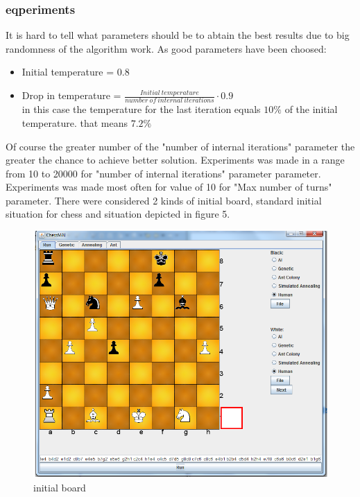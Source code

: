 \documentclass[pdftex]{article}
\begin{document}
\subsubsection{eqperiments}
It is hard to tell what parameters should be to abtain the best results due to big randomness of the algorithm work. As good parameters have been choosed:
\begin{itemize}
	\item Initial temperature = 0.8 \hfill \\

 	\item Drop in temperature = $\frac{Initial \: temperature}{number \: of \: internal \: iterations} \cdot 0.9$ \hfill \\
 	
in this case the temperature for the last iteration equals $10\%$ of the initial temperature. that means $7.2\%$
\end{itemize}
Of course the greater number of the "number of internal iterations" parameter the greater the chance to achieve better solution. Experiments was made in a range from 10 to 20000 for "number of internal iterations" parameter parameter.
Experiments was made most often for value of 10 for "Max number of turns" parameter. There were considered 2 kinds of initial board, standard initial situation for chess and situation depicted in figure 5.

\begin{figure}[!htb]
	\centering
	\includegraphics[width=1.0\textwidth]{annealing/board.png} 
	\caption{initial board}
	\label{fig:initialBoard}
\end{figure}
\end{document}
